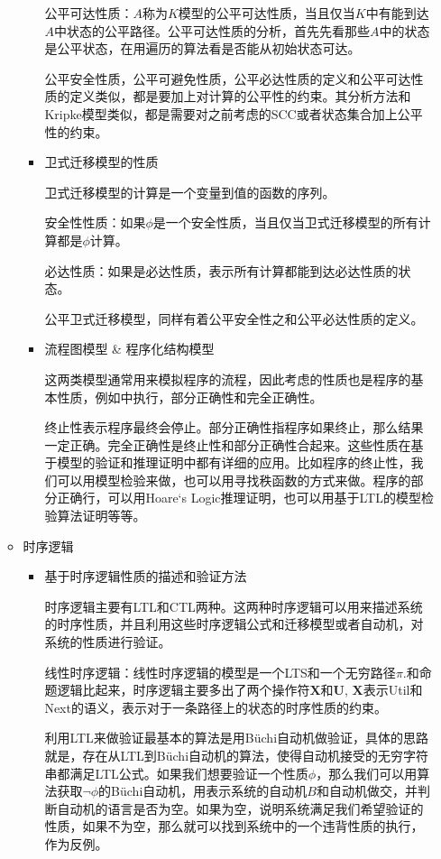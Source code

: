 \documentclass[UTF-8]{ctexart}
\begin{document}
\begin{enumerate}
\begin{itemize}
\begin{itemize}
公平可达性质：$A$称为$K$模型的公平可达性质，当且仅当$K$中有能到达$A$中状态的公平路径。公平可达性质的分析，首先先看那些$A$中的状态是公平状态，在用遍历的算法看是否能从初始状态可达。

公平安全性质，公平可避免性质，公平必达性质的定义和公平可达性质的定义类似，都是要加上对计算的公平性的约束。其分析方法和Kripke模型类似，都是需要对之前考虑的SCC或者状态集合加上公平性的约束。

\item 卫式迁移模型的性质

卫式迁移模型的计算是一个变量到值的函数的序列。

安全性性质：如果$\phi$是一个安全性质，当且仅当卫式迁移模型的所有计算都是$\phi$计算。

必达性质：如果是必达性质，表示所有计算都能到达必达性质的状态。

公平卫式迁移模型，同样有着公平安全性之和公平必达性质的定义。

\item 流程图模型 \& 程序化结构模型

这两类模型通常用来模拟程序的流程，因此考虑的性质也是程序的基本性质，例如中执行，部分正确性和完全正确性。

终止性表示程序最终会停止。部分正确性指程序如果终止，那么结果一定正确。完全正确性是终止性和部分正确性合起来。这些性质在基于模型的验证和推理证明中都有详细的应用。比如程序的终止性，我们可以用模型检验来做，也可以用寻找秩函数的方式来做。程序的部分正确行，可以用Hoare‘s Logic推理证明，也可以用基于LTL的模型检验算法证明等等。



\end{itemize}

\item 时序逻辑


\begin{itemize}

\item 基于时序逻辑性质的描述和验证方法

时序逻辑主要有LTL和CTL两种。这两种时序逻辑可以用来描述系统的时序性质，并且利用这些时序逻辑公式和迁移模型或者自动机，对系统的性质进行验证。

线性时序逻辑：线性时序逻辑的模型是一个LTS和一个无穷路径$\pi$.和命题逻辑比起来，时序逻辑主要多出了两个操作符$\textbf{X}$和$\textbf{U}$, $\textbf{X}$表示Util和Next的语义，表示对于一条路径上的状态的时序性质的约束。

利用LTL来做验证最基本的算法是用B\"uchi自动机做验证，具体的思路就是，存在从LTL到B\"uchi自动机的算法，使得自动机接受的无穷字符串都满足LTL公式。如果我们想要验证一个性质$\phi$，那么我们可以用算法获取$\neg \phi$的B\"uchi自动机，用表示系统的自动机$B$和自动机做交，并判断自动机的语言是否为空。如果为空，说明系统满足我们希望验证的性质，如果不为空，那么就可以找到系统中的一个违背性质的执行，作为反例。


\end{itemize}
\end{itemize}
\end{enumerate}
\end{document}
